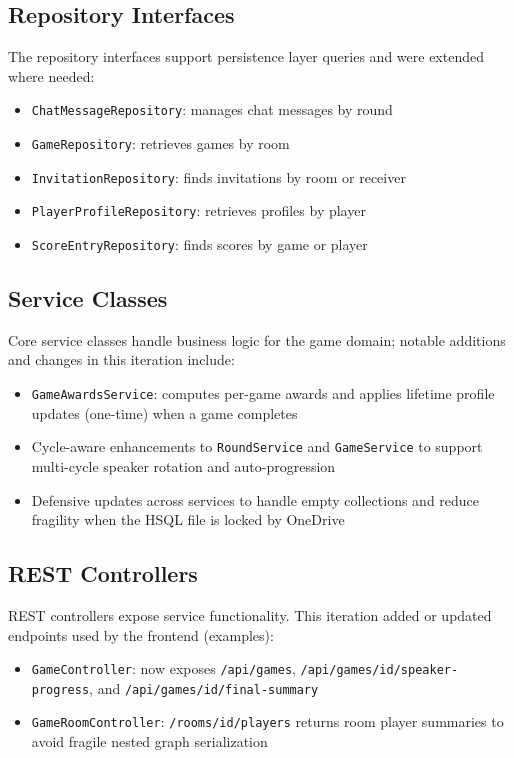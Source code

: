 \documentclass[11pt,a4paper]{article}
\begin{document}
\subsection{Repository Interfaces}

The repository interfaces support persistence layer queries and were extended where needed:

\begin{itemize}
    \item \texttt{ChatMessageRepository}: manages chat messages by round
    \item \texttt{GameRepository}: retrieves games by room
    \item \texttt{InvitationRepository}: finds invitations by room or receiver
    \item \texttt{PlayerProfileRepository}: retrieves profiles by player
    \item \texttt{ScoreEntryRepository}: finds scores by game or player
\end{itemize}

\subsection{Service Classes}

Core service classes handle business logic for the game domain; notable additions and changes in this iteration include:

\begin{itemize}
    \item \texttt{GameAwardsService}: computes per-game awards and applies lifetime profile updates (one-time) when a game completes
    \item Cycle-aware enhancements to \texttt{RoundService} and \texttt{GameService} to support multi-cycle speaker rotation and auto-progression
    \item Defensive updates across services to handle empty collections and reduce fragility when the HSQL file is locked by OneDrive
\end{itemize}

\subsection{REST Controllers}

REST controllers expose service functionality. This iteration added or updated endpoints used by the frontend (examples):

\begin{itemize}
    \item \texttt{GameController}: now exposes \texttt{/api/games}, \texttt{/api/games/{id}/speaker-progress}, and \texttt{/api/games/{id}/final-summary}
    \item \texttt{GameRoomController}: \texttt{/rooms/{id}/players} returns room player summaries to avoid fragile nested graph serialization
\end{itemize}
\end{document}
